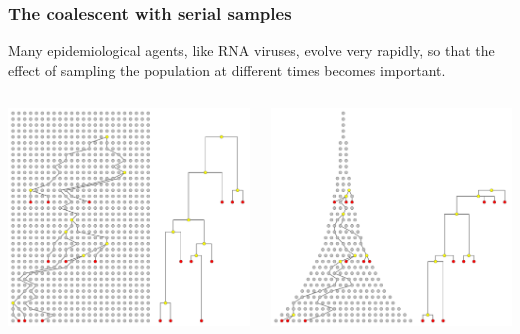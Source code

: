 \begin{frame}
\frametitle{The coalescent with serial samples}

Many epidemiological agents, like RNA viruses, evolve very rapidly, so that the effect of sampling the population at different times becomes important.

\begin{columns}[t]


\includegraphics[width=\textwidth]{../images/serialConstant}%



\includegraphics[width=\textwidth]{../images/serialExponential}%


\end{columns}

\end{frame}

